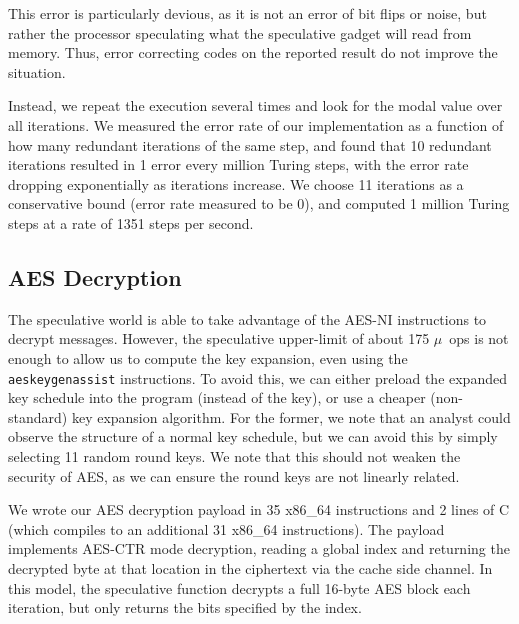 This error is particularly devious, as it is not an error of bit flips or noise,
but rather the processor speculating what the speculative gadget will read from
memory. Thus, error correcting codes on the reported result do not improve the
situation.


Instead, we repeat the execution several times and look for the modal value over
all iterations. We measured the error rate of our implementation as a function
of how many redundant iterations of the same step, and found that 10 redundant
iterations resulted in 1 error every million Turing steps, with the error rate
dropping exponentially as iterations increase. We choose 11 iterations as a
conservative bound (error rate measured to be 0), and computed 1 million Turing
steps at a rate of 1351 steps per second.






\subsection{AES Decryption}
\label{subsec:impl-aes}
The speculative world is able to take advantage of the AES-NI instructions to
decrypt messages. However, the speculative upper-limit of about 175 $\mu$~ops is
not enough to allow us to compute the key expansion, even using the
\texttt{aeskeygenassist} instructions. To avoid this, we can either preload the
expanded key schedule into the program (instead of the key), or use a cheaper
(non-standard) key expansion algorithm. For the former, we note that an analyst
could observe the structure of a normal key schedule, but we can avoid this by
simply selecting 11 random round keys. We note that this should not weaken the
security of AES, as we can ensure the round keys are not linearly related.


%

We wrote our AES decryption payload in 35 x86\_64 instructions and 2 lines of C
(which compiles to an additional 31 x86\_64 instructions). The payload
implements AES-CTR mode decryption, reading a global index and returning the
decrypted byte at that location in the ciphertext via the cache side channel.
In this model, the speculative function decrypts a full 16-byte AES block each
iteration, but only returns the bits specified by the index.


